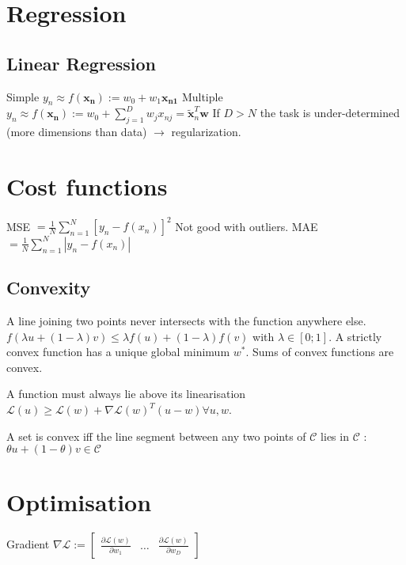 \section{Regression}
\subsection{Linear Regression}
Simple
$y_n \approx f(\mathbf{x_n}) := w_0 + w_1 \mathbf{x_{n1}}$\newline
Multiple
$y_n \approx f(\mathbf{x_n}) := w_0 + \sum_{j=1}^D w_j x_{nj} = \tilde{\mathbf{x}}_n^T \mathbf{w}$
If $D > N$ the task is under-determined (more dimensions than data) $\rightarrow$ regularization.

\section{Cost functions}
MSE $= \frac{1}{N} \sum_{n=1}^N [y_n - f(x_n)]^2$ Not good with outliers.
MAE $= \frac{1}{N} \sum_{n=1}^N |y_n - f(x_n)|$
\subsection{Convexity}
A line joining two points never intersects with the function anywhere else.
$f(\lambda u + (1-\lambda)v) \le \lambda f(u) + (1-\lambda) f(v)$ with $\lambda \in [0;1]$.
A strictly convex function has a unique global minimum $w^*$. Sums of convex functions are convex.

A function must always lie above its linearisation $\mathcal{L}(u) \ge \mathcal{L}(w) + \nabla \mathcal{L}(w)^T (u-w) \forall u,w$.

A set is convex iff the line segment between any two points of $\mathcal{C}$ lies in $\mathcal{C}$ : $\theta u + (1 - \theta) v \in \mathcal{C}$ 

\section{Optimisation}
Gradient $\nabla \mathcal{L} := \begin{bmatrix} \frac{\partial \mathcal{L}(w)}{\partial w_1} & \dots & \frac{\partial \mathcal{L}(w)}{\partial w_D} \end{bmatrix}$

